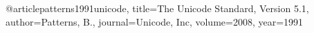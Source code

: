 @article{patterns1991unicode,
  title={{The Unicode Standard, Version 5.1}},
  author={Patterns, B.},
  journal={Unicode, Inc},
  volume={2008},
  year={1991}
}

